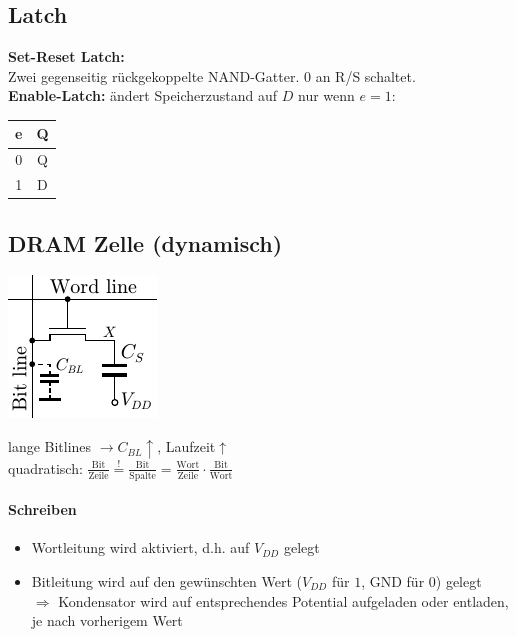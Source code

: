 \documentclass[6pt,a4paper]{scrartcl}
\renewcommand{\emph}[1]{\textsf{\textbf{#1}}}
\newcommand{\Ra}[0]{\ensuremath{\Rightarrow}}									%
\newcommand{\ra}[0]{\ensuremath{\rightarrow}} 									%
\begin{document}
\begin{multicols}{3}
	\subsection{Latch}
	\begin{multicols}{2}
	\emph{Set-Reset Latch:} \\ Zwei gegenseitig rückgekoppelte NAND-Gatter. $0$ an R/S schaltet. \\
	\emph{Enable-Latch:} ändert Speicherzustand auf $D$ nur wenn $e=1$: \begin{tabular}{c|c} e & Q \\ \hline 0 & Q \\ 1 & D \end{tabular}
	\end{multicols}
	\subsection{DRAM Zelle (dynamisch)}

	\parbox{3.0cm}{ \includegraphics{./img/ds/DRAM.pdf} }
	\parbox{6.0cm}{ 
	
	lange Bitlines $\ra C_{BL} \uparrow$, Laufzeit$\uparrow$\\
	quadratisch: $\frac{\text{Bit}}{\text{Zeile}} \stackrel{!}= \frac{\text{Bit}}{\text{Spalte}} = \frac{\text{Wort}}{\text{Zeile}} \cdot \frac{\text{Bit}}{\text{Wort}}$\\
	
	\paragraph{Schreiben}
		\begin{itemize}\itemsep0pt
			\item Wortleitung wird aktiviert, d.h. auf $V_{DD}$ gelegt
			\item Bitleitung wird auf den gewünschten Wert ($V_{DD}$ für $1$, GND für $0$) gelegt \\
			$\Ra$ Kondensator wird auf entsprechendes Potential aufgeladen oder entladen, je nach vorherigem Wert
		\end{itemize}
	}
	

\end{multicols}
\end{document}

